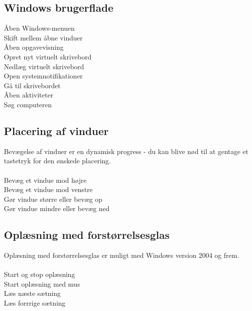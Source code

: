 \documentclass[a4paper, landscape, 11pt]{scrartcl}
\newcommand{\command}[2]{#1~\dotfill{}~#2\\} %
\begin{document}
\begin{multicols}{2}
\subsection*{Windows brugerflade}
\command{Åben Windows-menuen}{\keys{\faWindows}}
\command{Skift mellem åbne vinduer}{\keys{\Alt + \tab}}
\command{Åben opgavevisning}{\keys{\faWindows + \tab}}
\command{Opret nyt virtuelt skrivebord}{\keys{\faWindows + \ctrl + d}}
\command{Nedlæg virtuelt skrivebord}{\keys{\faWindows + \ctrl + F4}}
\command{Open systemnotifikationer}{}
\command{Gå til skrivebordet}{}
\command{Åben aktiviteter}{}
\command{Søg computeren}{}

\subsection*{Placering af vinduer}
Bevægelse af vinduer er en dynamisk progress - du kan blive nød til at gentage et tastetryk for den ønskede placering. \\ \\
\command{Bevæg et vindue mod højre}{\keys{\faWindows + \faArrowRight}}
\command{Bevæg et vindue mod venstre}{\keys{\faWindows + \faArrowLeft}}
\command{Gør vindue større eller bevæg op}{\keys{\faWindows + \faArrowUp}}
\command{Gør vindue mindre eller bevæg ned}{\keys{\faWindows + \faArrowDown}}

\subsection*{Oplæsning med forstørrelsesglas}
Oplæsning med forstørrelsesglas er muligt med Windows version 2004 og frem. \\ \\
\command{Start og stop oplæsning}{\keys{\ctrl + \Alt + \enter}}
\command{Start oplæsning med mus}{\keys{\ctrl + \Alt + venstre-klik}}
\command{Læs næste sætning}{}
\command{Læs forrrige sætning}{}
\end{multicols}

\hrulefill{}
\end{document}
